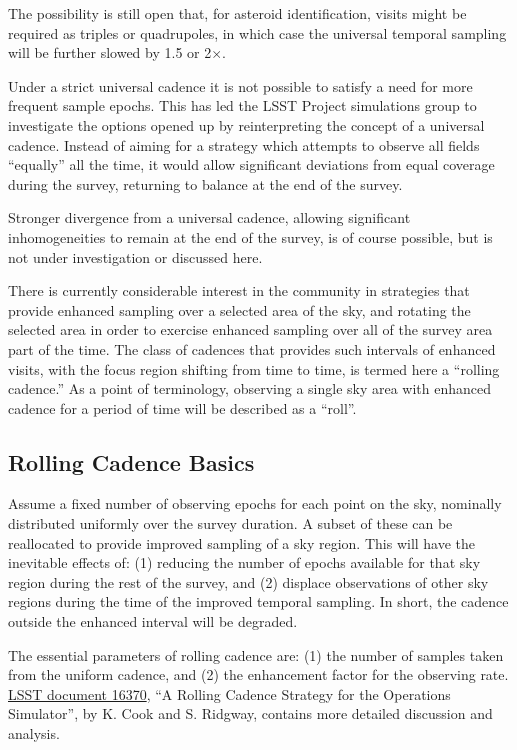 The possibility is still open that, for asteroid identification, visits
might be required as triples or quadrupoles, in which case the universal
temporal sampling will be further slowed by 1.5 or 2$\times$.

Under a strict universal cadence it is not possible to satisfy a need
for more frequent sample epochs.  This has led the LSST Project
simulations group to investigate the options opened up by reinterpreting
the concept of a universal cadence.  Instead of aiming for a strategy
which attempts to observe all fields ``equally'' all the time, it would
allow significant deviations from equal coverage during the survey,
returning to balance at the end of the survey.

Stronger divergence from a universal cadence, allowing significant
inhomogeneities to remain at the end of the survey, is of course
possible, but is not under investigation or discussed here.

There is currently considerable interest in the community in strategies
that provide enhanced sampling over a selected area of the sky, and
rotating the selected area in order to exercise enhanced sampling over
all of the survey area part of the time.  The class of cadences that
provides such intervals of enhanced visits, with the focus region
shifting from time to time, is termed here a ``rolling cadence.''  As a
point of terminology, observing a single sky area with enhanced cadence
for a period of time will be described as a ``roll''.


\subsection{Rolling Cadence Basics}

Assume a fixed number of observing epochs for each point on the sky,
nominally distributed uniformly over the survey duration.  A subset of
these can be reallocated to provide improved sampling of a sky region.
This will have the inevitable effects of: (1) reducing the number of
epochs available for that sky region during the rest of the survey, and
(2) displace observations of other sky regions during the time of the
improved temporal sampling.  In short, the cadence outside the enhanced
interval will be degraded.

The essential parameters of rolling cadence are: (1) the number of
samples taken from the uniform cadence, and (2) the enhancement factor
for the observing rate.
\href{https://project.lsst.org/meetings/ocw/sites/lsst.org.meetings.ocw/files/OpSim%20Rolling%20Cadence%20Stratgey-ver1.3.pdf}{LSST document 16370},
``A Rolling Cadence Strategy for the Operations Simulator'', by K. Cook
and S. Ridgway, contains more detailed discussion and analysis.

